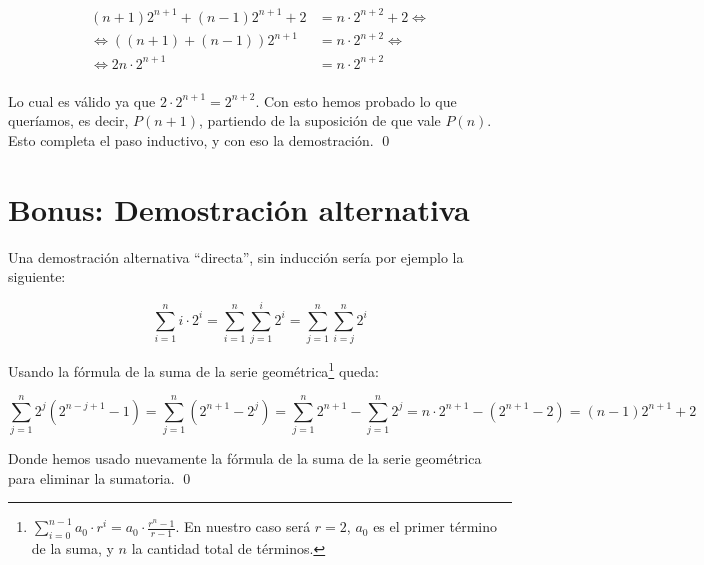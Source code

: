 \documentclass{article}
\begin{document}
\begin{align*}
(n+1) 2^{n+1} + (n-1) 2^{n+1} + 2 & =n \cdot 2^{n+2} + 2 \Leftrightarrow \\
\Leftrightarrow \left( (n+1) + (n-1) \right) 2^{n+1} & =n \cdot 2^{n+2} \Leftrightarrow \\
\Leftrightarrow 2n \cdot 2^{n+1} & =n \cdot 2^{n+2} \\
\end{align*}

Lo cual es válido ya que $2 \cdot 2^{n+1} = 2^{n+2}$. Con esto hemos probado lo que queríamos, es decir, $P(n+1)$, partiendo de la suposición de que vale $P(n)$.
Esto completa el paso inductivo, y con eso la demostración. \qed

\section{Bonus: Demostración alternativa}

Una demostración alternativa ``directa'', sin inducción sería por ejemplo la siguiente:

$$\sum_{i=1}^{n}{i \cdot 2^i} = \sum_{i=1}^{n}\sum_{j=1}^{i}{2^i} = \sum_{j=1}^{n}\sum_{i=j}^{n}{2^i}$$

Usando la fórmula de la suma de la serie geométrica\footnote{$\sum_{i=0}^{n-1}{a_0 \cdot r^i} = a_0 \cdot \frac{r^n-1}{r-1}$. En nuestro caso será $r=2$, $a_0$ es el primer término de la suma, y $n$ la cantidad total de términos.} queda:

$$\sum_{j=1}^{n}{2^j(2^{n-j+1} - 1)} = \sum_{j=1}^{n}{\left(2^{n+1} - 2^j\right)} = \sum_{j=1}^{n}{2^{n+1}} - \sum_{j=1}^{n}{2^j} = n \cdot 2^{n+1} - (2^{n+1} - 2) = (n-1) 2^{n+1} + 2$$

Donde hemos usado nuevamente la fórmula de la suma de la serie geométrica para eliminar la sumatoria. \qed
\end{document}
